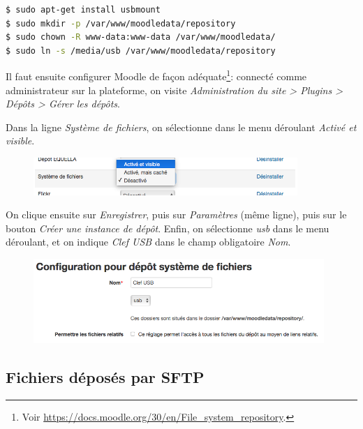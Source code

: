 \documentclass[11pt]{article}
\begin{document}
\begin{lstlisting}[language=bash]
$ sudo apt-get install usbmount
$ sudo mkdir -p /var/www/moodledata/repository
$ sudo chown -R www-data:www-data /var/www/moodledata/
$ sudo ln -s /media/usb /var/www/moodledata/repository
\end{lstlisting}

Il faut ensuite configurer Moodle de façon adéquate\footnote{Voir \url{https://docs.moodle.org/30/en/File_system_repository}.}: connecté comme administrateur sur la plateforme, on visite \emph{Administration du site > Plugins > Dépôts > Gérer les dépôts}.

Dans la ligne \emph{Système de fichiers}, on sélectionne dans le menu déroulant \emph{Activé et visible}.

\begin{figure}[!ht]
\begin{minipage}[b]{\linewidth}
\centering
\includegraphics[width=10cm]{repo-filesystem-usb-1.png}
\end{minipage}
\end{figure}

On clique ensuite sur \emph{Enregistrer}, puis sur \emph{Paramètres} (même ligne), puis sur le bouton \emph{Créer une instance de dépôt}. Enfin, on sélectionne \emph{usb} dans le menu déroulant, et on indique \emph{Clef USB} dans le champ obligatoire \emph{Nom}.

\begin{figure}[!ht]
\begin{minipage}[b]{\linewidth}
\centering
\includegraphics[width=11cm]{repo-filesystem-usb-2.png}
\end{minipage}
\end{figure}

\subsection{Fichiers déposés par SFTP}
\end{document}
